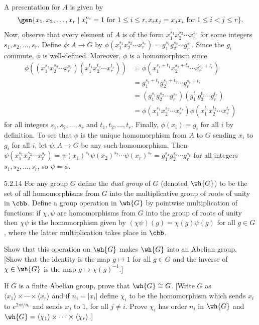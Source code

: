 \begin{sol}
    A presentation for $A$ is given by
    \[
    	\gen{x_1, x_2, \ldots, x_r \mid x_i^{n_i} = 1 \text{ for } 1 \leq i \leq r, x_ix_j = x_jx_i \text{ for } 1 \leq i < j \leq r}.
    \]
    Now, observe that every element of $A$ is of the form $x_1^{s_1} x_2^{s_2} \cdots x_r^{s_r}$ for some integers $s_1, s_2, \ldots, s_r$.
	Define $\phi : A \to G$ by $\phi(x_1^{s_1} x_2^{s_2} \cdots x_r^{s_r}) = g_1^{s_1} g_2^{s_2} \cdots g_r^{s_r}$.
	Since the $g_i$ commute, $\phi$ is well-defined.
	Moreover, $\phi$ is a homomorphism since
    \begin{align*}
        \phi((x_1^{s_1} x_2^{s_2} \cdots x_r^{s_r})(x_1^{t_1} x_2^{t_2} \cdots x_r^{t_r})) & = \phi(x_1^{s_1 + t_1} x_2^{s_2 + t_2} \cdots x_r^{s_r + t_r}) \\
        & = g_1^{s_1 + t_1} g_2^{s_2 + t_2} \cdots g_r^{s_r + t_r} \\
        & = (g_1^{s_1} g_2^{s_2} \cdots g_r^{s_r})(g_1^{t_1} g_2^{t_2} \cdots g_r^{t_r}) \\
        & = \phi(x_1^{s_1} x_2^{s_2} \cdots x_r^{s_r})\phi(x_1^{t_1} x_2^{t_2} \cdots x_r^{t_r})
    \end{align*}
    for all integers $s_1, s_2, \ldots, s_r$ and $t_1, t_2, \ldots, t_r$.
	Finally, $\phi(x_i) = g_i$ for all $i$ by definition.
	To see that $\phi$ is the unique homomorphism from $A$ to $G$ sending $x_i$ to $g_i$ for all $i$, let $\psi : A \to G$ be any such homomorphism.
	Then $\psi(x_1^{s_1} x_2^{s_2} \cdots x_r^{s_r}) = \psi(x_1)^{s_1} \psi(x_2)^{s_2} \cdots \psi(x_r)^{s_r} = g_1^{s_1} g_2^{s_2} \cdots g_r^{s_r}$ for all integers $s_1, s_2, \ldots, s_r$, so $\psi = \phi$.
\end{sol}

\begin{spex}{5.2.14}
    For any group $G$ define the \emph{dual group} of $G$ (denoted $\wh{G}$) to be the set of all homomorphisms from $G$ into the multiplicative group of roots of unity in $\cbb$.
	Define a group operation in $\wh{G}$ by pointwise multiplication of functions: if $\chi, \psi$ are homomorphisms from $G$ into the group of roots of unity then $\chi\psi$ is the homomorphism given by $(\chi\psi)(g) = \chi(g)\psi(g)$ for all $g \in G$, where the latter multiplication takes place in $\cbb$.
    \begin{subexercises}
        \item Show that this operation on $\wh{G}$ makes $\wh{G}$ into an Abelian group. [Show that the identity is the map $g \mapsto 1$ for all $g \in G$ and the inverse of $\chi \in \wh{G}$ is the map $g \mapsto \chi(g)^{-1}$.]
        \item If $G$ is a finite Abelian group, prove that $\wh{G} \cong G$. [Write $G$ as $\langle x_1 \rangle \times \cdots \times \langle x_r \rangle$ and if $n_i = |x_i|$ define $\chi_i$ to be the homomorphism which sends $x_i$ to $e^{2\pi i/n_i}$ and sends $x_j$ to $1$, for all $j \neq i$.
	Prove $\chi_i$ has order $n_i$ in $\wh{G}$ and $\wh{G} = \langle \chi_1 \rangle \times \cdots \times \langle \chi_r \rangle$.]
    \end{subexercises}
\end{spex}


